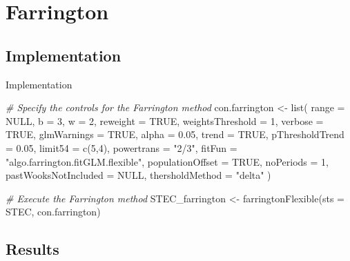\documentclass[aspectratio=169]{beamer}
\newenvironment{Shaded}{\begin{snugshade}}{\end{snugshade}}
\newcommand{\AttributeTok}[1]{\textcolor[rgb]{0.77,0.63,0.00}{#1}}
\newcommand{\CommentTok}[1]{\textcolor[rgb]{0.56,0.35,0.01}{\textit{#1}}}
\newcommand{\ConstantTok}[1]{\textcolor[rgb]{0.00,0.00,0.00}{#1}}
\newcommand{\DecValTok}[1]{\textcolor[rgb]{0.00,0.00,0.81}{#1}}
\newcommand{\FloatTok}[1]{\textcolor[rgb]{0.00,0.00,0.81}{#1}}
\newcommand{\FunctionTok}[1]{\textcolor[rgb]{0.00,0.00,0.00}{#1}}
\newcommand{\NormalTok}[1]{#1}
\newcommand{\OtherTok}[1]{\textcolor[rgb]{0.56,0.35,0.01}{#1}}
\newcommand{\StringTok}[1]{\textcolor[rgb]{0.31,0.60,0.02}{#1}}
\begin{document}
\hypertarget{farrington}{%
\section{Farrington}\label{farrington}}

\hypertarget{implementation}{%
\subsection{Implementation}\label{implementation}}

\begin{frame}[fragile]{Implementation}
\tiny

\begin{Shaded}
\begin{Highlighting}[]
\CommentTok{\# Specify the controls for the Farrington method}
\NormalTok{con.farrington }\OtherTok{\textless{}{-}} \FunctionTok{list}\NormalTok{(}
  \AttributeTok{range =} \ConstantTok{NULL}\NormalTok{, }\AttributeTok{b =} \DecValTok{3}\NormalTok{, }\AttributeTok{w =} \DecValTok{2}\NormalTok{,}
  \AttributeTok{reweight =} \ConstantTok{TRUE}\NormalTok{, }\AttributeTok{weightsThreshold =} \DecValTok{1}\NormalTok{,}
  \AttributeTok{verbose =} \ConstantTok{TRUE}\NormalTok{, }\AttributeTok{glmWarnings =} \ConstantTok{TRUE}\NormalTok{,}
  \AttributeTok{alpha =} \FloatTok{0.05}\NormalTok{, }\AttributeTok{trend =} \ConstantTok{TRUE}\NormalTok{, }\AttributeTok{pThresholdTrend =} \FloatTok{0.05}\NormalTok{,}
  \AttributeTok{limit54 =} \FunctionTok{c}\NormalTok{(}\DecValTok{5}\NormalTok{,}\DecValTok{4}\NormalTok{), }\AttributeTok{powertrans =} \StringTok{"2/3"}\NormalTok{,}
  \AttributeTok{fitFun =} \StringTok{"algo.farrington.fitGLM.flexible"}\NormalTok{,}
  \AttributeTok{populationOffset =} \ConstantTok{TRUE}\NormalTok{,}
  \AttributeTok{noPeriods =} \DecValTok{1}\NormalTok{, }\AttributeTok{pastWooksNotIncluded =} \ConstantTok{NULL}\NormalTok{,}
  \AttributeTok{thersholdMethod =} \StringTok{"delta"}
\NormalTok{)}

\CommentTok{\# Execute the Farrington method}
\NormalTok{STEC\_farrington }\OtherTok{\textless{}{-}} \FunctionTok{farringtonFlexible}\NormalTok{(}\AttributeTok{sts =}\NormalTok{ STEC, con.farrington)}
\end{Highlighting}
\end{Shaded}

\normalsize
\end{frame}

\hypertarget{results}{%
\subsection{Results}\label{results}}
\end{document}
